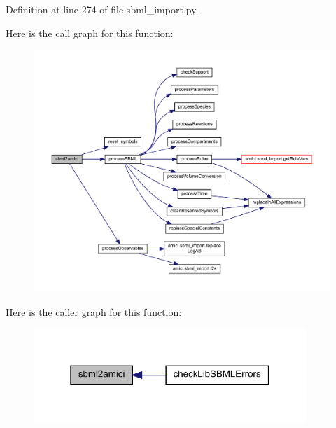 Definition at line 274 of file sbml\+\_\+import.\+py.

Here is the call graph for this function\+:
\nopagebreak
\begin{figure}[H]
\begin{center}
\leavevmode
\includegraphics[width=350pt]{classamici_1_1sbml__import_1_1_sbml_importer_a83900bb62c0121eb798939a6d4232a9c_cgraph}
\end{center}
\end{figure}
Here is the caller graph for this function\+:
\nopagebreak
\begin{figure}[H]
\begin{center}
\leavevmode
\includegraphics[width=292pt]{classamici_1_1sbml__import_1_1_sbml_importer_a83900bb62c0121eb798939a6d4232a9c_icgraph}
\end{center}
\end{figure}
\mbox{\label{classamici_1_1sbml__import_1_1_sbml_importer_ac188693ab1d9fc500d55748dbde9bf89}} 
